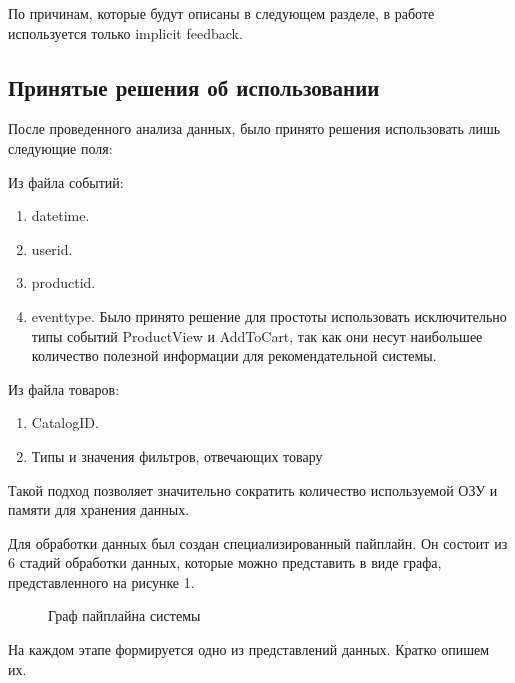\documentclass[14pt]{mmcs_article}
\newenvironment{myenumerate}
{ \begin{enumerate}
		\setlength{\itemsep}{0pt}
		\setlength{\parskip}{0pt}
		\setlength{\parsep}{0pt}     }
	{ \end{enumerate}                  }
\begin{document}
По причинам, которые будут описаны в следующем разделе, в работе используется только implicit feedback.

\subsection{Принятые решения об использовании}

После проведенного анализа данных, было принято решения использовать лишь следующие поля:

Из файла событий:

\begin{myenumerate}
		\item datetime.
		\item userid. 
		\item productid.
		\item eventtype. Было принято решение для простоты использовать исключительно типы событий ProductView и AddToCart, так как они несут наибольшее количество полезной информации для рекомендательной системы. 
\end{myenumerate}

Из файла товаров:

\begin{myenumerate}
	\item CatalogID.
	\item Типы и значения фильтров, отвечающих товару
\end{myenumerate}

Такой подход позволяет значительно сократить количество используемой ОЗУ и памяти для хранения данных.

Для обработки данных был создан специализированный пайплайн. Он состоит из 6 стадий обработки данных, которые можно представить в виде графа, представленного на рисунке 1. 

\begin{figure}[H]
\caption{Граф пайплайна системы}\label{stud:fig:2}
\end{figure}
На каждом этапе формируется одно из представлений данных. Кратко опишем их.
\end{document}
